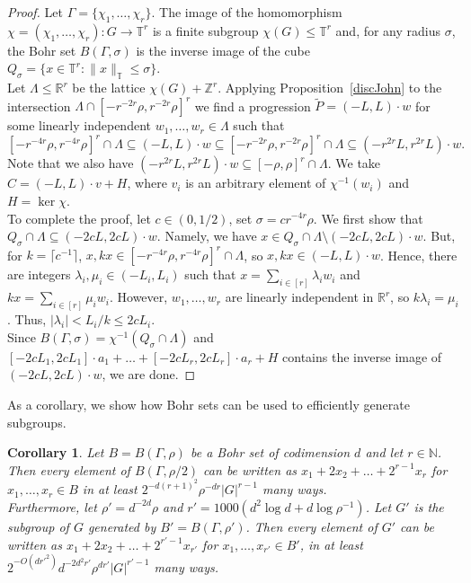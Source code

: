 \documentclass[a4paper,11pt]{article}
\numberwithin{theorem}{section}
\newtheorem{corollary}[theorem]{Corollary}
\theoremstyle{definition}
\newcommand{\on}[1]{
	\operatorname{#1}
}
\newcommand{\uc}[1]{
    \|#1\|_{\mathbb{T}}
}
\begin{document}
\begin{proof}
    Let $\Gamma = \{\chi_1, \dots, \chi_r\}$. The image of the homomorphism $\chi = (\chi_1, \dots, \chi_r): G \to \mathbb{T}^r$ is a finite subgroup $\chi(G) \leq \mathbb{T}^r$ and, for any radius $\sigma$, the Bohr set $B(\Gamma, \sigma)$ is the inverse image of the cube $Q_\sigma = \{x \in \mathbb{T}^r : \uc{x}\leq \sigma\}$.\\
    \indent Let $\Lambda \leq \mathbb{R}^r$ be the lattice $\chi(G) + \mathbb{Z}^r$. Applying Proposition~\ref{discJohn} to the intersection $\Lambda \cap [-r^{-2r}\rho, r^{-2r}\rho]^r$ we find a progression $\tilde{P} = (-L, L)\cdot w$ for some linearly independent $w_1, \dots, w_r \in \Lambda$ such that
    \[[-r^{-4r}\rho, r^{-4r}\rho]^r \cap \Lambda \subseteq (-L, L) \cdot w \subseteq [-r^{-2r}\rho, r^{-2r}\rho]^r \cap \Lambda \subseteq (-r^{2r} L, r^{2r} L) \cdot w.\]
    Note that we also have $(-r^{2r} L, r^{2r} L) \cdot w \subseteq [-\rho, \rho]^r \cap \Lambda$. We take $C = (-L, L) \cdot v + H$, where $v_i$ is an arbitrary element of $\chi^{-1}(w_i)$ and $H = \on{ker}\chi$.\\
    \indent To complete the proof, let $c \in (0,1/2)$, set $\sigma = cr^{-4r}\rho$. We first show that $Q_{\sigma} \cap \Lambda \subseteq (-2cL, 2cL) \cdot w$. Namely, we have $x \in Q_\sigma \cap \Lambda \setminus (-2cL, 2cL) \cdot w$. But, for $k = \lceil c^{-1} \rceil$, $x, kx \in [-r^{-4r}\rho, r^{-4r}\rho]^r \cap \Lambda$, so $x, kx \in (-L, L) \cdot w$. Hence, there are integers $\lambda_i, \mu_i \in (-L_i, L_i)$ such that $x = \sum_{i \in [r]} \lambda_i w_i$ and $kx = \sum_{i \in [r]} \mu_i w_i$. However, $w_1, \dots, w_r$ are linearly independent in $\mathbb{R}^r$, so $k \lambda_i = \mu_i$. Thus, $|\lambda_i| < L_i/k \leq 2c L_i$.\\
    Since $B(\Gamma, \sigma) = \chi^{-1}(Q_\sigma \cap \Lambda)$ and $[-2c L_1, 2cL_1] \cdot a_1 + \dots +[-2cL_r, 2cL_r] \cdot a_r + H$ contains the inverse image of $(-2cL, 2cL) \cdot w$, we are done.
\end{proof}

As a corollary, we show how Bohr sets can be used to efficiently generate subgroups.

\begin{corollary}\label{subgroupgenerationiteratedsumsbohr}
    Let $B = B(\Gamma, \rho)$ be a Bohr set of codimension $d$ and let $r \in \mathbb{N}$. Then every element of $ B(\Gamma, \rho/2)$ can be written as $x_1 + 2x_2 + \dots + 2^{r-1}x_{r}$ for $x_1, \dots, x_r \in B$ in at least $2^{-d(r+1)^2}\rho^{-dr}|G|^{r-1}$ many ways.\\
    \indent Furthermore, let $\rho' = d^{-2d} \rho$ and $r' = 1000 (d^2 \log d + d \log \rho^{-1})$. Let $G'$ is the subgroup of $G$ generated by $B' = B(\Gamma, \rho')$. Then every element of $G'$ can be written as $x_1 + 2x_2 + \dots + 2^{r'-1}x_{r'}$ for $x_1, \dots, x_{r'} \in B'$, in at least $2^{-O(d{r'}^2)}d^{-2d^2r'}\rho^{dr'}|G|^{r'-1}$ many ways.
\end{corollary}
\end{document}
